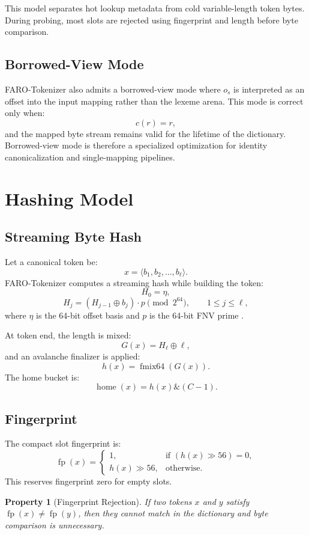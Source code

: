 \documentclass[11pt,a4paper]{article}
\newtheorem{property}{Property}
\newcommand{\FP}{\operatorname{fp}}
\newcommand{\home}{\operatorname{home}}
\begin{document}
This model separates hot lookup metadata from cold variable-length token bytes. During probing, most slots are rejected using fingerprint and length before byte comparison.

\subsection{Borrowed-View Mode}

FARO-Tokenizer also admits a borrowed-view mode where \(o_s\) is interpreted as an offset into the input mapping rather than the lexeme arena. This mode is correct only when:
\[
c(r)=r,
\]
and the mapped byte stream remains valid for the lifetime of the dictionary. Borrowed-view mode is therefore a specialized optimization for identity canonicalization and single-mapping pipelines.

\section{Hashing Model}

\subsection{Streaming Byte Hash}

Let a canonical token be:
\[
x=\langle b_1,b_2,\dots,b_\ell\rangle.
\]
FARO-Tokenizer computes a streaming hash while building the token:
\[
H_0 = \eta,
\]
\[
H_j = (H_{j-1}\oplus b_j)\cdot p \pmod{2^{64}},
\qquad 1\le j\le \ell,
\]
where \(\eta\) is the 64-bit offset basis and \(p\) is the 64-bit FNV prime \cite{Eastlake2026FNV}.

At token end, the length is mixed:
\[
G(x)=H_\ell\oplus \ell,
\]
and an avalanche finalizer is applied:
\[
h(x)=\operatorname{fmix64}(G(x)).
\]
The home bucket is:
\[
\home(x)=h(x)\mathbin{\&}(C-1).
\]

\subsection{Fingerprint}

The compact slot fingerprint is:
\[
\FP(x)=
\begin{cases}
1, & \text{if } (h(x)\gg 56)=0,\\
h(x)\gg 56, & \text{otherwise}.
\end{cases}
\]
This reserves fingerprint zero for empty slots.

\begin{property}[Fingerprint Rejection]
If two tokens \(x\) and \(y\) satisfy \(\FP(x)\ne\FP(y)\), then they cannot match in the dictionary and byte comparison is unnecessary.
\end{property}
\end{document}
